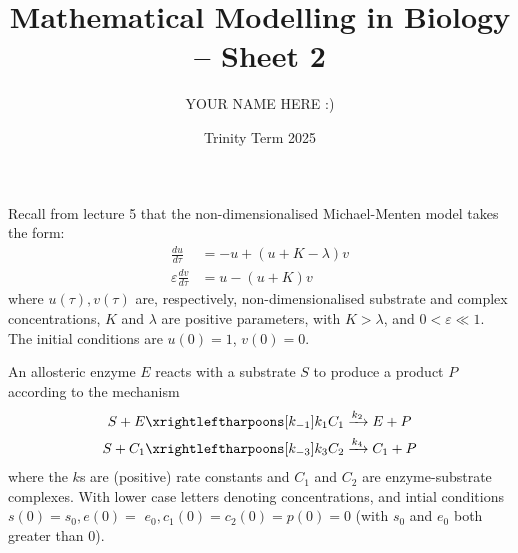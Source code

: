 \documentclass[answers]{exam}
\title{Mathematical Modelling in Biology -- Sheet 2}
\author{YOUR NAME HERE :)}
\date{Trinity Term 2025}
\begin{document}
\maketitle
\begin{questions}

\question%
Recall from lecture 5 that the non-dimensionalised Michael-Menten model takes the form: \begin{align*}
	\frac{d u}{d \tau} & =-u+(u+K-\lambda) v \\
	\varepsilon \frac{d v}{d \tau} & =u-(u+K) v
\end{align*} where $u(\tau), v(\tau)$ are, respectively, non-dimensionalised substrate and complex concentrations, $K$ and $\lambda$ are positive parameters, with $K>\lambda$, and $0<\varepsilon \ll 1$. The initial conditions are $u(0)=1$, $v(0)=0$.



\question%
An allosteric enzyme $E$ reacts with a substrate $S$ to produce a product $P$ according to the mechanism \begin{align*}
	S+E&\xrightleftharpoons[k_{-1}]{k_1} C_1\xrightarrow{k_2} E+P\\
	S+C_1&\xrightleftharpoons[k_{-3}]{k_3} C_2\xrightarrow{k_4} C_1+P
\end{align*} where the $k$s are (positive) rate constants and $C_1$ and $C_2$ are enzyme-substrate complexes. With lower case letters denoting concentrations, and intial conditions $s(0)=s_0, e(0)=$ $e_0, c_1(0)=c_2(0)=p(0)=0$ (with $s_0$ and $e_0$ both greater than 0).
\end{questions}
\end{document}
